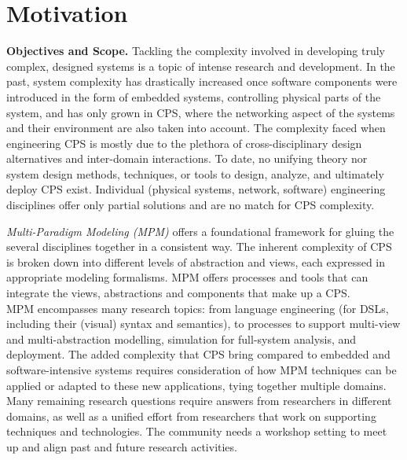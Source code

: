 \section{Motivation}
\label{sec:Motivation}


\noindent
\textbf{Objectives and Scope.}
%
Tackling the complexity involved in developing truly complex, designed systems 
is a topic of intense research and development.
In the past, system complexity has drastically increased once software components 
were introduced in the form of embedded systems, controlling physical parts of 
the system, and has only grown in CPS, where the networking aspect of the systems 
and their environment are also taken into account.
The complexity faced when engineering CPS is mostly due to the plethora of 
cross-disciplinary design alternatives and inter-domain interactions.
To date, no unifying theory nor system design methods, techniques, or tools to 
design, analyze, and ultimately deploy CPS exist.
Individual (physical systems, network, software) engineering disciplines offer 
only partial solutions and are no match for CPS complexity.



\emph{Multi-Paradigm Modeling (MPM)} offers a foundational framework for gluing the 
several disciplines together in a consistent way.
The inherent complexity of CPS is broken down into different levels of 
abstraction and views, each expressed in appropriate modeling formalisms.
MPM offers processes and tools that can integrate the views, abstractions and 
components that make up a CPS.\\
MPM encompasses many research topics: from language engineering (for DSLs, 
including their (visual) syntax and semantics), to processes to support multi-view 
and multi-abstraction modelling, simulation for full-system analysis, and deployment.
The added complexity that CPS bring compared to embedded and software-intensive 
systems requires consideration of how MPM techniques can be applied or adapted 
to these new applications, tying together multiple domains.
Many remaining research questions require answers from researchers in different 
domains, as well as a unified effort from researchers that work on supporting 
techniques and technologies.
The community needs a workshop setting to meet up and align past and future 
research activities.


